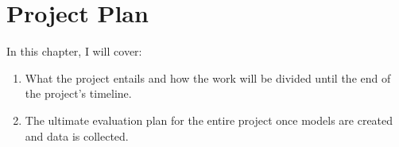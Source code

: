 \chapter{Project Plan}
  In this chapter, I will cover:
  \begin{enumerate}
    \item What the project entails and how the work will be divided until the end of the project's timeline.
    \item The ultimate evaluation plan for the entire project once models are created and data is collected.
  \end{enumerate}


